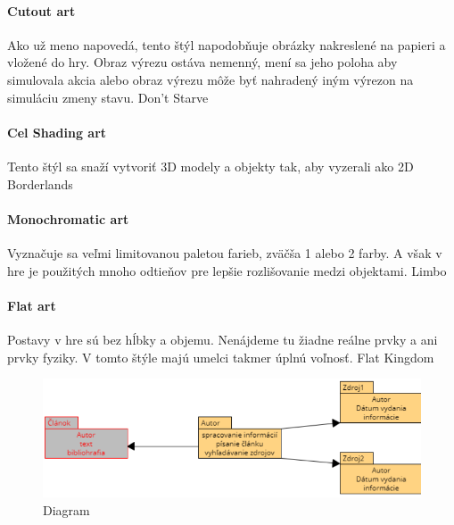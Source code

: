 \documentclass[10pt,twoside,slovak,a4paper]{article}
\begin{document}
\paragraph{Cutout art}
Ako už meno napovedá, tento štýl napodobňuje obrázky nakreslené na papieri a vložené do hry. Obraz výrezu ostáva nemenný, mení sa jeho poloha aby simulovala akcia alebo obraz výrezu môže byť nahradený iným výrezon na simuláciu zmeny stavu.
Don't Starve

\paragraph{Cel Shading art}
Tento štýl sa snaží vytvoriť 3D modely a objekty tak, aby vyzerali ako 2D
Borderlands
\paragraph{Monochromatic art}
Vyznačuje sa veľmi limitovanou paletou farieb, zväčša 1 alebo 2 farby. A však v hre je použitých mnoho odtieňov pre lepšie rozlišovanie medzi objektami.
Limbo
\paragraph{Flat art}
Postavy v hre sú bez hĺbky a objemu. Nenájdeme tu žiadne reálne prvky a ani prvky fyziky. V tomto štýle majú umelci takmer úplnú voľnosť.
Flat Kingdom

\begin{figure}
\begin{center}
\includegraphics[width=12cm]{diagram novy.png}
\caption{Diagram}
\end{center}
\end{figure}




























\end{document}
